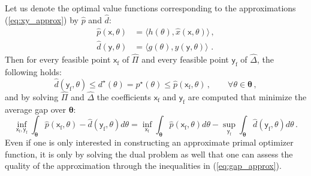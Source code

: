 \documentclass{article}
\newcommand{\commentGP}[1]{\noindent \textcolor{blue}{\emph{$<\,$GP: #1$\,>$}}}%
\newcommand{\opt}{\star}                    %
\newcommand{\feas}{\mathrm{f}}              %
\newcommand{\ppar}{\theta}                          %
\newcommand{\Ppar}{{\bm{\theta}}}                   %
\newcommand{\calF}{\mathcal{F}}                     %
\newcommand{\cx}{\textsf{x}}        %
\newcommand{\cy}{\textsf{y}}        %
\begin{document}
Let us denote the optimal value functions corresponding to the approximations (\ref{eq:xy_approx}) by $\hat{p}$ and $\hat{d}$:
\begin{align*}
\hat{p}(\cx,\ppar) &= \langle h(\ppar), \hat{x}(\cx,\ppar) \rangle \,,\\%
\hat{d}(\cy,\ppar) &= \langle g(\ppar), \hat{y}(\cy,\ppar) \rangle \,  \,.%
\end{align*}
Then for every feasible point $\cx_\feas$ of $\hat{\Pi}$ and every feasible point $\cy_\feas$ of $\hat{\Delta}$, the following holds:
\begin{equation}\label{eq:gap_approx}
\hat{d}(\cy_\feas,\ppar) \leq d^\opt(\ppar) = p^\opt(\ppar) \leq \hat{p}(\cx_\feas,\ppar)\,,\qquad\forall\ppar\in\Ppar\,,%
\end{equation}
and by solving $\hat{\Pi}$ and $\hat{\Delta}$ the coefficients $\cx_\feas$ and $\cy_\feas$ are computed that minimize the average gap over $\Ppar$:
\[ \inf_{\cx_\feas,\cy_\feas} \int_{\Ppar} \hat{p}(\cx_\feas,\ppar) - \hat{d}(\cy_\feas,\ppar) d\ppar = %
   \inf_{\cx_\feas} \int_{\Ppar} \hat{p}(\cx_\feas,\ppar) d\ppar - \sup_{\cy_\feas} \int_{\Ppar} \hat{d}(\cy_\feas,\ppar) d\ppar\,.%
\]
Even if one is only interested in constructing an approximate primal optimizer function, it is only by solving the dual problem as well that one can assess the quality of the approximation through the inequalities in (\ref{eq:gap_approx}).
\end{document}
